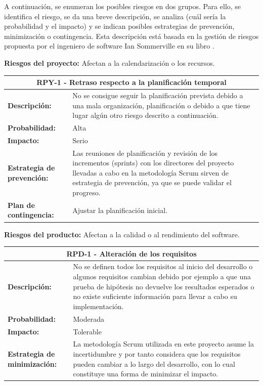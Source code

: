 A continuación, se enumeran los posibles riesgos en dos grupos. Para ello, se identifica el riesgo, se da una breve descripción, se analiza (cuál sería la probabilidad y el impacto) y se indican posibles estrategias de prevención, minimización o contingencia. Esta descripción está basada en la gestión de riesgos propuesta por el ingeniero de software Ian Sommerville en su libro \cite{sommerville}.

\noindent
\textbf{Riesgos del proyecto:} Afectan a la calendarización o los recursos.

\begin{table}[H]
	\begin{tabular}{| p{4cm}| p{10cm} |}
		\hline
		\multicolumn{2}{|c|}{\textbf{RPY-1} - Retraso respecto a la planificación temporal} \\ \hline
		\textbf{Descripción:} & No se consigue seguir la planificación prevista debido a una mala organización, planificación o debido a que tiene lugar algún otro riesgo descrito a continuación. \\ \hline
		\textbf{Probabilidad:} & Alta \\ \hline
		\textbf{Impacto:} & Serio \\ \hline
		\textbf{Estrategia de prevención:} & Las reuniones de planificación y revisión de los incrementos (sprints) con los directores del proyecto llevadas a cabo en la metodología Scrum sirven de estrategia de prevención, ya que se puede validar el progreso. \\ \hline
		\textbf{Plan de contingencia:} & Ajustar la planificación inicial. \\ \hline
	\end{tabular}
\end{table}

\noindent
\textbf{Riesgos del producto:} Afectan a la calidad o al rendimiento del software.

\begin{table}[H]
	\begin{tabular}{| p{4cm}| p{10cm} |}
		\hline
		\multicolumn{2}{|c|}{\textbf{RPD-1} - Alteración de los requisitos} \\ \hline
		\textbf{Descripción:} & No se definen todos los requisitos al inicio del desarrollo o algunos requisitos cambian debido por ejemplo a que una prueba de hipótesis no devuelve los resultados esperados o no existe suficiente información para llevar a cabo su implementación. \\ \hline
		\textbf{Probabilidad:} & Moderada \\ \hline
		\textbf{Impacto:} & Tolerable \\ \hline
		\textbf{Estrategia de minimización:} & La metodología Scrum utilizada en este proyecto asume la incertidumbre y por tanto considera que los requisitos pueden cambiar a lo largo del desarrollo, con lo cual constituye una forma de minimizar el impacto. \\ \hline
	\end{tabular}
\end{table}

